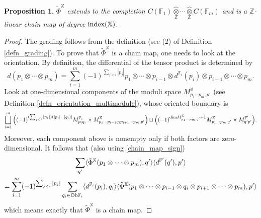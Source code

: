 \documentclass[reqno, 10pt]{amsart}
\numberwithin{equation}{section}
\numberwithin{equation}{section}
\newtheorem{prop}[thm]{Proposition}
\theoremstyle{definition}
\theoremstyle{remark}
\newcommand{\beqn}{\begin{equation*}}
\newcommand{\eeqn}{\end{equation*}}
\newcommand{\mb}{\mathbb}
\begin{document}
\begin{prop}\label{prop_chain_map}
$\tilde \Phi^{\mb X}$ extends to the completion $\displaystyle C ({\mb F}_1) \widehat{\underset{{\mb Z}}{\otimes}} \cdots \widehat{\underset{{\mb Z}}{\otimes}} C ({\mb F}_m)$ and is a ${\mb Z}$-linear chain map of degree ${\rm index}({\mb X})$.
\end{prop}

\begin{proof}
The grading follows from the definition (see (2) of Definition \ref{defn_grading}). To prove that $\tilde \Phi^{\mb X}$ is a chain map, one needs to look at the orientation. By definition, the differential of the tensor product is determined by 
\beqn
d(p_1 \otimes \cdots \otimes p_m) = \sum_{i=1}^m (-1)^{ \sum_{j<i} |p_j|}  p_1 \otimes \cdots \otimes p_{i-1} \otimes d^{{\mb F}_i}(p_i) \otimes p_{i+1} \otimes \cdots \otimes p_m.
\eeqn
Look at one-dimensional components of the moduli space $M_{p_1 \cdots p_m; p'}^{\mb X}$ (see Definition \ref{defn_orientation_multimodule}), whose oriented boundary is 
\beqn
\bigsqcup_{i=1}^m \Big( (-1)^{(\sum_{j<i}|p_j|)(|p_i|-|q_i)|} M_{p_i q_i}^{{\mb F}_i} \times M_{p_1 \cdots p_{i-1} q_i p_{i+1} \cdots p_m; p'}^{{\mb X}}  \Big) \sqcup \Big((-1)^{{\rm dim} M_{p_1 \cdots p_m; q'}^{\mb X} + 1} M_{p_1 \cdots p_m; q'}^{{\mb X}} \times M_{q'p'}^{{\mb F}'}\Big).
\eeqn
Moreover, each component above is nonempty only if both factors are zero-dimensional. It follows that (also using \eqref{chain_map_sign})
\begin{multline*}
\sum_{q'} \langle \tilde\Phi^{\mb X}(p_1\otimes \cdots \otimes p_m), q'\rangle \langle d^{{\mb F}'}(q'), p' \rangle \\
= \sum_{i=1}^m (-1)^{\sum_{j<i}|p_j|} \sum_{q_i\in {\rm Ob}{\mb F}_i} \langle d^{{\mb F}_i}(p_i), q_i \rangle \langle \tilde\Phi^{{\mb X}}(p_1\otimes \cdots \otimes p_{i-1} \otimes q_i \otimes p_{i+1} \otimes \cdots \otimes p_m), p'\rangle
     \end{multline*}
     which means exactly that $\tilde \Phi^{{\mb X}}$ is a chain map.
\end{proof}
\end{document}
